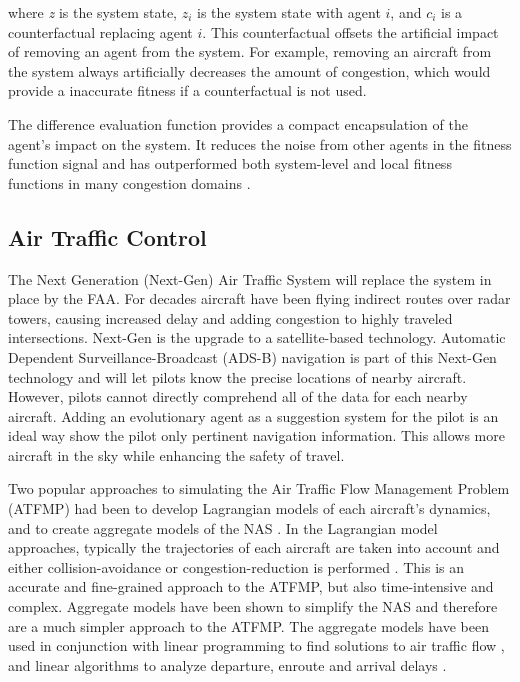 \documentclass{sig-alternate}
\begin{document}
where \textit{z} is the system state, $z_i$ is the system state with agent $i$, and $c_i$ is a counterfactual replacing agent $i$. This counterfactual offsets the artificial impact of removing an agent from the system. For example, removing an aircraft from the system always artificially decreases the amount of congestion, which would provide a inaccurate fitness if a counterfactual is not used.

The difference evaluation function provides a compact encapsulation of the agent's impact on the system. It reduces the noise from other agents in the fitness function signal and has outperformed both system-level and local fitness functions in many congestion domains \cite{AAMAS12-agmon, tumer-agogino_jaamas12, Colby:2012:SFF:2343576.2343637}.

\subsection{Air Traffic Control}

The Next Generation (Next-Gen) Air Traffic System will replace the system in place by the FAA. For decades aircraft have been flying indirect routes over radar towers, causing increased delay and adding congestion to highly traveled intersections. Next-Gen is the upgrade to a satellite-based technology. Automatic Dependent Surveillance-Broadcast (ADS-B) navigation is part of this Next-Gen technology and will let pilots know the precise locations of nearby aircraft. However, pilots cannot directly comprehend all of the data for each nearby aircraft. Adding an evolutionary agent as a suggestion system for the pilot is an ideal way show the pilot only pertinent navigation information. This allows more aircraft in the sky while enhancing the safety of travel.

Two popular approaches to simulating the Air Traffic Flow Management Problem (ATFMP) had been to develop Lagrangian models of each aircraft's dynamics, and to create aggregate models of the NAS \cite{Bertsimas:1998:ATF:767667.768027, McNally, Mueller_analysisof}. In the Lagrangian model approaches, typically the trajectories of each aircraft are taken into account and either collision-avoidance or congestion-reduction is performed \cite{McNally}. This is an accurate and fine-grained approach to the ATFMP, but also time-intensive and complex. Aggregate models have been shown to simplify the NAS and therefore are a much simpler approach to the ATFMP. The aggregate models have been used in conjunction with linear programming to find solutions to air traffic flow \cite{Bertsimas:1998:ATF:767667.768027}, and linear algorithms to analyze departure, enroute and arrival delays \cite{Mueller_analysisof}.
\end{document}

